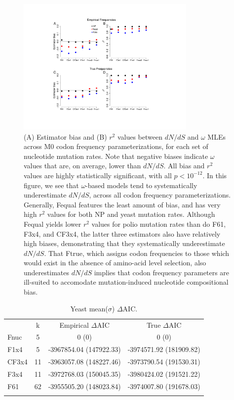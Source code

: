 \documentclass{pnastwo}
\newcommand{\xline}[0]{\noindent\underline{\makebox[0.15cm][l]{}}}
\begin{document}
\begin{figure}[htbp]
	\centerline{\includegraphics[width=8.7cm]{figures/MainText/nyp_bias_r2.pdf}}
	\caption{\label{nyp_bias_r2} (A) Estimator bias and (B) $r^2$ values between $dN/dS$ and $\omega$ MLEs across M0 codon frequency parameterizations, for each set of nucleotide mutation rates. Note that negative biases indicate $\omega$ values that are, on average, lower than $dN/dS$. All bias and $r^2$ values are highly statistically significant, with all $p < 10^{-12}$. In this figure, we see that $\omega$-based models tend to systematically underestimate $dN/dS$, across all codon frequency parameterizations. Generally, F\protect\xline equal features the least amount of bias, and has very high $r^2$ values for both NP and yeast mutation rates. Although Fequal yields lower $r^2$ values for polio mutation rates than do F61, F3x4, and CF3x4, the latter three estimators also have relatively high biases, demonstrating that they systematically underestimate $dN/dS$. That Ftrue, which assigns codon frequencies to those which would exist in the absence of amino-acid level selection, also underestimates $dN/dS$ implies that codon frequency parameters are ill-suited to accomodate mutation-induced nucleotide compositional bias.}	
\end{figure}

\vspace{2cm}	
	
\begin{table}[htbp]
	\caption {\label{tab:AIC_yeast} Yeast mean($\sigma$) $\Delta$AIC.}
	\begin{tabular}{l c c c}
		\hline\noalign{\smallskip}
		\multicolumn{1}{c}{Frequencies} & k & Empirical $\Delta$AIC & True $\Delta$AIC \\
		\noalign{\smallskip}\hline\noalign{\smallskip}
		Fnuc & 5 & 0 (0)  & 0 (0)  \\ 
		F1x4 & 5 & -3967854.04 (147922.33)  & -3974571.92 (181909.82)  \\ 
		CF3x4 & 11 & -3963057.08 (148227.46)  & -3973790.54 (191530.31)  \\ 
		F3x4 & 11 & -3972768.03 (150045.35)  & -3980424.02 (191521.22)  \\ 
		F61 & 62 & -3955505.20 (148023.84)  & -3974007.80 (191678.03)  \\ 
		\noalign{\smallskip}\hline\noalign{\smallskip} 
	\end{tabular}
\end{table}
\clearpage
\end{document}

